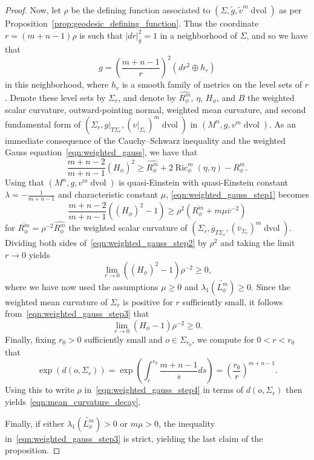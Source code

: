 \documentclass{amsart}
\theoremstyle{definition}
\theoremstyle{remark}
\numberwithin{equation}{section}
\begin{document}
\begin{proof}
Now, let $\rho$ be the defining function associated to $(\Sigma,\tilde g,\tilde v^m\operatorname{dvol})$ as per Proposition~\ref{prop:geodesic_defining_function}.  Thus the coordinate $r=(m+n-1)\rho$ is such that ${\lvert} dr{\rvert}_{\overline{g}}^2=1$ in a neighborhood of $\Sigma$, and so we have that
\[ g = \left(\frac{m+n-1}{r}\right)^2\left( dr^2\oplus h_r \right) \]
in this neighborhood, where $h_r$ is a smooth family of metrics on the level sets of $r$.  Denote these level sets by $\Sigma_r$, and denote by $\widehat{R_\phi^m}$, $\eta$, $H_\phi$, and $B$ the weighted scalar curvature, outward-pointing normal, weighted mean curvature, and second fundamental form of $(\Sigma_r,g{\rvert}_{T\Sigma_r},(v{\rvert}_{\Sigma_r})^m\operatorname{dvol})$ in $(M^n,g,v^m\operatorname{dvol})$.  As an immediate consequence of the Cauchy--Schwarz inequality and the weighted Gauss equation~\eqref{eqn:weighted_gauss}, we have that
\begin{equation}
\label{eqn:weighted_gauss_step1}
\frac{m+n-2}{m+n-1}(H_\phi)^2 \geq \widehat{R_\phi^m} + 2\operatorname{Ric}_\phi^m(\eta,\eta) - R_\phi^m .
\end{equation}
Using that $(M^n,g,v^m\operatorname{dvol})$ is quasi-Einstein with quasi-Einstein constant $\lambda=-\frac{1}{m+n-1}$ and characteristic constant $\mu$, \eqref{eqn:weighted_gauss_step1} becomes
\begin{equation}
\label{eqn:weighted_gauss_step2}
\frac{m+n-2}{m+n-1}\left((H_\phi)^2 - 1 \right) \geq \rho^2\left( \overline{R_\phi^m} + m\mu{\overline{v}}^{-2}\right)
\end{equation}
for $\overline{R_\phi^m}=\rho^{-2}\widehat{R_\phi^m}$ the weighted scalar curvature of $(\Sigma_r,{\overline{g}}_{T\Sigma_r},({\overline{v}}_{\Sigma_r})^m\operatorname{dvol})$.  Dividing both sides of~\eqref{eqn:weighted_gauss_step2} by $\rho^2$ and taking the limit $r\to0$ yields
\begin{equation}
\label{eqn:weighted_gauss_step3}
\lim_{r\to 0} \left((H_\phi)^2 - 1\right)\rho^{-2} \geq 0,
\end{equation}
where we have now used the assumptions $\mu\geq 0$ and $\lambda_1(\widetilde{L_\phi^m})\geq 0$.  Since the weighted mean curvature of $\Sigma_r$ is positive for $r$ sufficiently small, it follows from~\eqref{eqn:weighted_gauss_step3} that
\begin{equation}
\label{eqn:weighted_gauss_step4}
\lim_{r\to 0} \left(H_\phi - 1\right)\rho^{-2} \geq 0 .
\end{equation}
Finally, fixing $r_0>0$ sufficiently small and $o\in\Sigma_{r_0}$, we compute for $0<r<r_0$ that
\[ \exp\left(d(o,\Sigma_r)\right) = \exp\left(\int_r^{r_0} \frac{m+n-1}{s}ds\right) = \left(\frac{r_0}{r}\right)^{m+n-1} . \]
Using this to write $\rho$ in~\eqref{eqn:weighted_gauss_step4} in terms of $d(o,\Sigma_r)$ then yields~\eqref{eqn:mean_curvature_decay}.

Finally, if either $\lambda_1(\widetilde{L_\phi^m})>0$ or $m\mu>0$, the inequality in~\eqref{eqn:weighted_gauss_step3} is strict, yielding the last claim of the proposition.
\end{proof}
\end{document}
